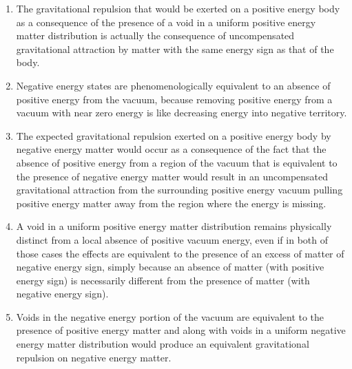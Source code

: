 \documentclass[notitlepage,12pt]{report}
\begin{document}
\begin{enumerate}
\item The gravitational repulsion that would be exerted on a positive energy body as a consequence of the presence of a void in a uniform positive energy matter distribution is actually the consequence of uncompensated gravitational attraction by matter with the same energy sign as that of the body.

\item Negative energy states are phenomenologically equivalent to an absence of positive energy from the vacuum, because removing positive energy from a vacuum with near zero energy is like decreasing energy into negative territory.

\item The expected gravitational repulsion exerted on a positive energy body by negative energy matter would occur as a consequence of the fact that the absence of positive energy from a region of the vacuum that is equivalent to the presence of negative energy matter would result in an uncompensated gravitational attraction from the surrounding positive energy vacuum pulling positive energy matter away from the region where the energy is missing.

\item A void in a uniform positive energy matter distribution remains physically distinct from a local absence of positive vacuum energy, even if in both of those cases the effects are equivalent to the presence of an excess of matter of negative energy sign, simply because an absence of matter (with positive energy sign) is necessarily different from the presence of matter (with negative energy sign).

\item Voids in the negative energy portion of the vacuum are equivalent to the presence of positive energy matter and along with voids in a uniform negative energy matter distribution would produce an equivalent gravitational repulsion on negative energy matter.


\end{enumerate}
\end{document}
